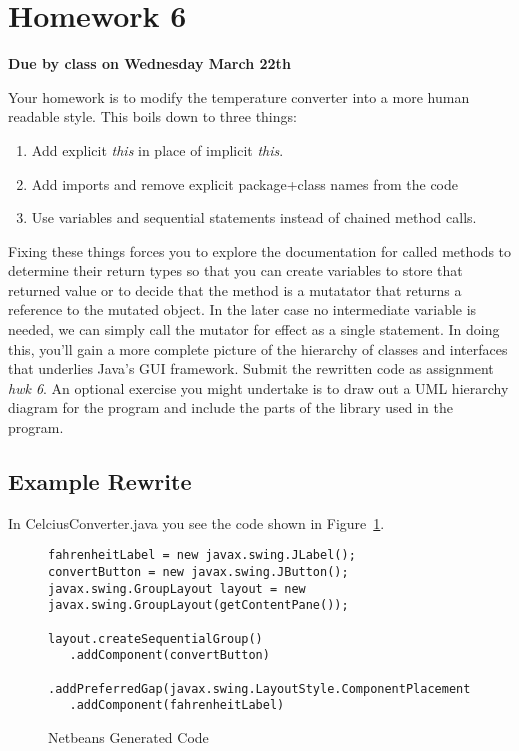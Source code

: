 \documentclass[]{tufte-handout}
\begin{document}
\section{Homework 6}

\begin{center}
\textbf{Due by class on Wednesday March 22th}
\end{center}

Your homework is to modify the temperature converter into a more human readable style. This boils down to three things:
\begin{enumerate}
\item Add explicit \textit{this} in place of implicit \textit{this}.
\item Add imports and remove explicit package+class names from the code
\item Use variables and sequential statements instead of chained method calls.
\end{enumerate}
Fixing these things forces you to explore the documentation for called methods to determine their return types so that you can create variables to store that returned value or to decide that the method is a mutatator that returns a reference to the mutated object. In the later case no intermediate variable is needed, we can simply call the mutator for effect as a single statement.  In doing this, you'll gain a more complete picture of the hierarchy of classes and interfaces that underlies Java's GUI framework. Submit the rewritten code as assignment \textit{hwk 6}. An optional exercise you might undertake is to draw out a UML hierarchy diagram for the program and include the parts of the library used in the program.


\subsection*{Example Rewrite}

In CelciusConverter.java you see the code shown in Figure~\ref{orig}.
\begin{figure}[ht]
\begin{lstlisting}
fahrenheitLabel = new javax.swing.JLabel();
convertButton = new javax.swing.JButton();
javax.swing.GroupLayout layout = new javax.swing.GroupLayout(getContentPane());

layout.createSequentialGroup()
   .addComponent(convertButton)
   .addPreferredGap(javax.swing.LayoutStyle.ComponentPlacement.RELATED)
   .addComponent(fahrenheitLabel)
\end{lstlisting}
\label{orig}
\caption{Netbeans Generated Code}
\end{figure}
\end{document}
